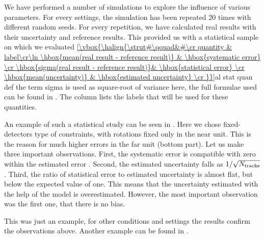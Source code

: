 
We have performed a number of simulations to explore the influence of various parameters. For every settings, the simulation has been repeated 20 times with different random seeds. For every repetition, we have calculated real results with their uncertainty and reference results. This provided us with a statistical sample on which we evaluated
\eqref{\vbox{\halign{\strut#\qquad&#\cr
quantity & label\cr\ln
\hbox{mean(real result - reference result)}	& \hbox{systematic error} \cr
\hbox{sigma(real result - reference result)}& \hbox{statistical error} \cr
\hbox{mean(uncertainty)} 					& \hbox{estimated uncertainty} \cr
}}}{al stat quan def}
the term sigma is used as square-root of variance here, the full formulae used can be found in . The \rhs{} column lists the labels that will be used for these quantities.

An example of such a statistical study can be seen in . Here we chose fixed-detectors type of constraints, with rotations fixed only in the near unit. This is the reason for much higher errors in the far unit (bottom part). Let us make three important observations. First, the systematic error is compatible with zero within the estimated error . Second, the estimated uncertainty falls as $1/\sqrt{N_{\rm tracks}}$. Third, the ratio of statistical error to estimated uncertainty is almost flat, but below the expected value of one. This means that the uncertainty estimated with the help of the model  is overestimated. However, the most important observation was the first one, that there is no bias.

This was just an example, for other conditions and settings the results confirm the observations above. Another example can be found in .


